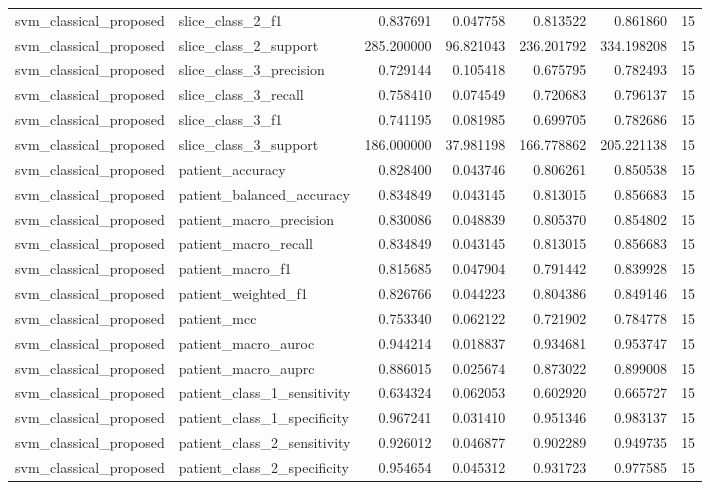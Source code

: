 \begin{tabular}{llrrrrr}
svm_classical_proposed & slice_class_2_f1 & 0.837691 & 0.047758 & 0.813522 & 0.861860 & 15 \\
svm_classical_proposed & slice_class_2_support & 285.200000 & 96.821043 & 236.201792 & 334.198208 & 15 \\
svm_classical_proposed & slice_class_3_precision & 0.729144 & 0.105418 & 0.675795 & 0.782493 & 15 \\
svm_classical_proposed & slice_class_3_recall & 0.758410 & 0.074549 & 0.720683 & 0.796137 & 15 \\
svm_classical_proposed & slice_class_3_f1 & 0.741195 & 0.081985 & 0.699705 & 0.782686 & 15 \\
svm_classical_proposed & slice_class_3_support & 186.000000 & 37.981198 & 166.778862 & 205.221138 & 15 \\
svm_classical_proposed & patient_accuracy & 0.828400 & 0.043746 & 0.806261 & 0.850538 & 15 \\
svm_classical_proposed & patient_balanced_accuracy & 0.834849 & 0.043145 & 0.813015 & 0.856683 & 15 \\
svm_classical_proposed & patient_macro_precision & 0.830086 & 0.048839 & 0.805370 & 0.854802 & 15 \\
svm_classical_proposed & patient_macro_recall & 0.834849 & 0.043145 & 0.813015 & 0.856683 & 15 \\
svm_classical_proposed & patient_macro_f1 & 0.815685 & 0.047904 & 0.791442 & 0.839928 & 15 \\
svm_classical_proposed & patient_weighted_f1 & 0.826766 & 0.044223 & 0.804386 & 0.849146 & 15 \\
svm_classical_proposed & patient_mcc & 0.753340 & 0.062122 & 0.721902 & 0.784778 & 15 \\
svm_classical_proposed & patient_macro_auroc & 0.944214 & 0.018837 & 0.934681 & 0.953747 & 15 \\
svm_classical_proposed & patient_macro_auprc & 0.886015 & 0.025674 & 0.873022 & 0.899008 & 15 \\
svm_classical_proposed & patient_class_1_sensitivity & 0.634324 & 0.062053 & 0.602920 & 0.665727 & 15 \\
svm_classical_proposed & patient_class_1_specificity & 0.967241 & 0.031410 & 0.951346 & 0.983137 & 15 \\
svm_classical_proposed & patient_class_2_sensitivity & 0.926012 & 0.046877 & 0.902289 & 0.949735 & 15 \\
svm_classical_proposed & patient_class_2_specificity & 0.954654 & 0.045312 & 0.931723 & 0.977585 & 15 \\

\end{tabular}
